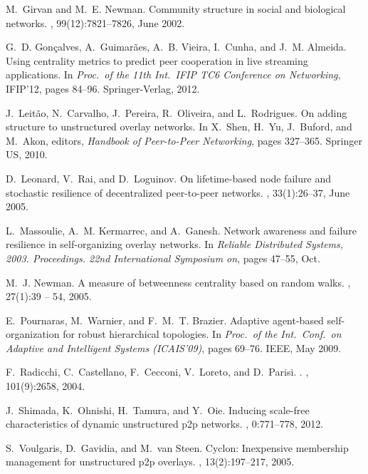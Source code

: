 \documentclass[10pt, conference, compsocconf]{IEEEtran}
\begin{document}
\begin{thebibliography}{10}
M.~Girvan and M.~E. Newman.
\newblock Community structure in social and biological networks.
, 99(12):7821--7826, June 2002.

G.~D. Gon\c{c}alves, A.~Guimar\~{a}es, A.~B. Vieira, I.~Cunha, and J.~M.
  Almeida.
\newblock Using centrality metrics to predict peer cooperation in live
  streaming applications.
\newblock In {\em Proc.~of the 11th Int.~IFIP TC6 Conference on Networking},
  IFIP'12, pages 84--96. Springer-Verlag, 2012.

J.~Leitão, N.~Carvalho, J.~Pereira, R.~Oliveira, and L.~Rodrigues.
\newblock On adding structure to unstructured overlay networks.
\newblock In X.~Shen, H.~Yu, J.~Buford, and M.~Akon, editors, {\em Handbook of
  Peer-to-Peer Networking}, pages 327--365. Springer US, 2010.

D.~Leonard, V.~Rai, and D.~Loguinov.
\newblock On lifetime-based node failure and stochastic resilience of
  decentralized peer-to-peer networks.
, 33(1):26--37, June 2005.

L.~Massoulie, A.~M. Kermarrec, and A.~Ganesh.
\newblock Network awareness and failure resilience in self-organizing overlay
  networks.
\newblock In {\em Reliable Distributed Systems, 2003. Proceedings. 22nd
  International Symposium on}, pages 47--55, Oct.

M.~J. Newman.
\newblock A measure of betweenness centrality based on random walks.
, 27(1):39 -- 54, 2005.

E.~Pournaras, M.~Warnier, and F.~M.~T. Brazier.
\newblock Adaptive agent-based self-organization for robust hierarchical
  topologies.
\newblock In {\em Proc.~of the Int.~Conf.~on Adaptive and Intelligent Systems
  (ICAIS'09)}, pages 69--76. IEEE, May 2009.

F.~Radicchi, C.~Castellano, F.~Cecconi, V.~Loreto, and D.~Parisi.
.
, 101(9):2658,
  2004.

J.~Shimada, K.~Ohnishi, H.~Tamura, and Y.~Oie.
\newblock Inducing scale-free characteristics of dynamic unstructured p2p
  networks.
, 0:771--778, 2012.

S.~Voulgaris, D.~Gavidia, and M.~van Steen.
\newblock Cyclon: Inexpensive membership management for unstructured p2p
  overlays.
, 13(2):197--217, 2005.

\end{thebibliography}
\end{document}
